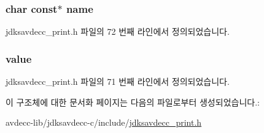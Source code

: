\subsubsection[{\texorpdfstring{name}{name}}]{\setlength{\rightskip}{0pt plus 5cm}char const$\ast$ name}\hypertarget{structjdksavdecc__uint64__name_a5f1de76dd5d451949e12c0fbc966ca70}{}\label{structjdksavdecc__uint64__name_a5f1de76dd5d451949e12c0fbc966ca70}


jdksavdecc\+\_\+print.\+h 파일의 72 번째 라인에서 정의되었습니다.

\subsubsection[{\texorpdfstring{value}{value}}]{ value}\hypertarget{structjdksavdecc__uint64__name_a4e630859cc0e2a22bd6acf39a6a8e218}{}\label{structjdksavdecc__uint64__name_a4e630859cc0e2a22bd6acf39a6a8e218}


jdksavdecc\+\_\+print.\+h 파일의 71 번째 라인에서 정의되었습니다.



이 구조체에 대한 문서화 페이지는 다음의 파일로부터 생성되었습니다.\+:\begin{DoxyCompactItemize}
\item 
avdecc-\/lib/jdksavdecc-\/c/include/\hyperlink{jdksavdecc__print_8h}{jdksavdecc\+\_\+print.\+h}\end{DoxyCompactItemize}
